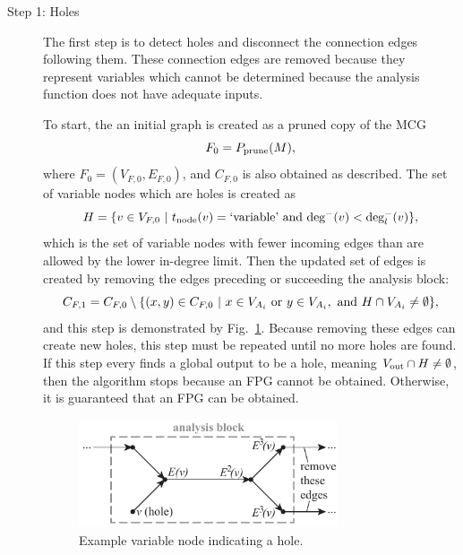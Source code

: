 \begin{description}
	\item[Step 1: Holes] 
		The first step is to detect holes and disconnect the connection edges following them. 
		These connection edges are removed because they represent variables which cannot be determined because the analysis function does not have adequate inputs. 

		To start, the an initial graph is created as a pruned copy of the MCG
		\begin{equation}
		F_0 = P_\textrm{prune}(M),
		\end{equation}
		where $F_0 = (V_{F,0},E_{F,0})$, and $C_{F,0}$ is also obtained as described. 
		The set of variable nodes which are holes is created as
		\begin{equation}
		H = \{v \in V_{F,0} \ | \  t_\textrm{node}(v) = \textrm{`variable'} \textrm{ and } \textrm{deg}^-(v) < \textrm{deg}_l^-(v) \},
		\end{equation}
		which is the set of variable nodes with fewer incoming edges than are allowed by the lower in-degree limit.
		Then the updated set of edges is created by removing the edges preceding or succeeding the analysis block:
		\begin{equation}
		C_{F,1} = C_{F,0} \setminus \{(x,y) \in C_{F,0} \ | \  x \in V_{A_i} \textrm{ or } y \in V_{A_i}, \textrm{ and } H\cap V_{A_i} \neq \emptyset \},
	\end{equation}
	and this step is demonstrated by Fig.~\ref{f:hole}. Because removing these edges can create new holes, this step must be repeated until no more holes are found.
		If this step every finds a global output to be a hole, meaning $V_\textrm{out} \cap H \neq \emptyset$, then the algorithm stops because an FPG cannot be obtained. 
		Otherwise, it is guaranteed that an FPG can be obtained.
	\begin{figure}[htb!]
		\begin{center}
		\includegraphics[width=3in]{images/analysis_block_hole}
		\end{center}
		\vspace{-20pt}
	\caption{Example variable node indicating a hole.}
	\label{f:hole}
	\end{figure}


\end{description}
